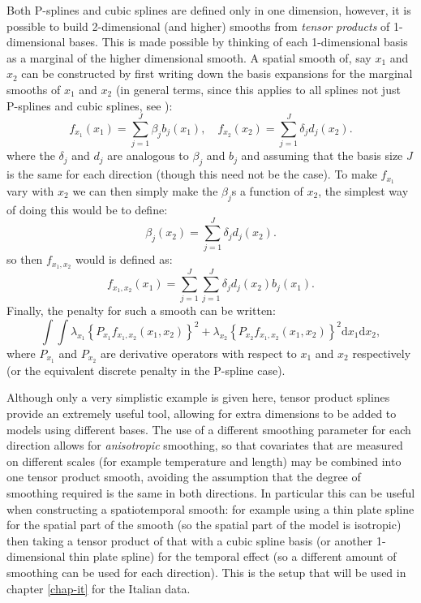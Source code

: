 Both P-splines and cubic splines are defined only in one dimension, however, it is possible to build 2-dimensional (and higher) smooths from \textit{tensor products} of 1-dimensional bases. This is made possible by thinking of each 1-dimensional basis as a marginal of the higher dimensional smooth. A spatial smooth of, say $x_1$ and $x_2$ can be constructed by first writing down the basis expansions for the marginal smooths of $x_1$ and $x_2$ (in general terms, since this applies to all splines not just P-splines and cubic splines, see ):
\begin{equation}
f_{x_1}(x_1) = \sum_{j=1}^J \beta_j b_j(x_{1}), \quad  f_{x_2}(x_2) = \sum_{j=1}^J \delta_j d_j(x_{2}).
\label{intro-tensor-def}
\end{equation}
where the $\delta_j$ and $d_j$ are analogous to $\beta_j$ and $b_j$ and assuming that the basis size $J$ is the same for each direction (though this need not be the case). To make $f_{x_1}$ vary with $x_2$ we can then simply make the $\beta_j$s a function of $x_2$, the simplest way of doing this would be to define:
\begin{equation*}
\beta_j(x_2) = \sum_{j=1}^J \delta_j d_j(x_{2}).
\end{equation*}
so then $f_{x_1,x_2}$ would is defined as:
\begin{equation*}
f_{x_1, x_2}(x_1) = \sum_{j=1}^J \sum_{j=1}^J \delta_j d_j(x_{2}) b_j(x_{1}).
\end{equation*}
Finally, the penalty for such a smooth can be written:
\begin{equation*}
\int\int \lambda_{x_1} \left \{P_{x_1} f_{x_1, x_2}(x_1,x_2)\right \}^2 + \lambda_{x_2} \left \{P_{x_2} f_{x_1, x_2}(x_1,x_2)\right \}^2 \text{d}x_1\text{d}x_2,
\end{equation*}
where $P_{x_1}$ and $P_{x_2}$ are derivative operators with respect to $x_1$ and $x_2$ respectively (or the equivalent discrete penalty in the P-spline case).

Although only a very simplistic example is given here, tensor product splines provide an extremely useful tool, allowing for extra dimensions to be added to models using different bases. The use of a different smoothing parameter for each direction allows for \textit{anisotropic} smoothing, so that covariates that are measured on different scales (for example temperature and length) may be combined into one tensor product smooth, avoiding the assumption that the degree of smoothing required is the same in both directions. In particular this can be useful when constructing a spatiotemporal smooth: for example using a thin plate spline for the spatial part of the smooth (so the spatial part of the model is isotropic) then taking a tensor product of that with a cubic spline basis (or another 1-dimensional thin plate spline) for the temporal effect (so a different amount of smoothing can be used for each direction). This is the setup that will be used in chapter \ref{chap-it} for the Italian data.

